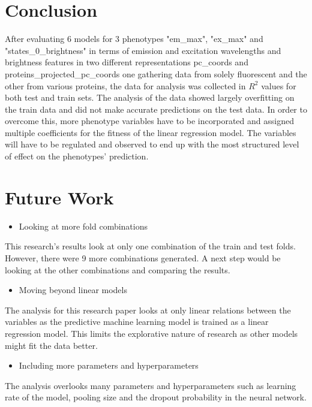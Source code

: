 \documentclass{article}
\begin{document}
\section{Conclusion}
After evaluating 6 models for 3 phenotypes "em\_max", "ex\_max" and        
"states\_0\_brightness" in terms of emission and excitation wavelengths and brightness features in two different representations pc\_coords and proteins\_projected\_pc\_coords one gathering data from solely fluorescent and the other from various proteins, the data for analysis was collected in $R^2$ values for both test and train sets. The analysis of the data showed largely overfitting on the train data and did not make accurate predictions on the test data. In order to overcome this, more phenotype variables have to be incorporated and assigned multiple coefficients for the fitness of the linear regression model. The variables will have to be regulated and observed to end up with the most structured level of effect on the phenotypes' prediction.

\section{Future Work}

\begin{itemize}
\item Looking at more fold combinations
\end{itemize}
This research's results look at only one combination of the train and test folds. However, there were 9 more combinations generated. A next step would be looking at the other combinations and comparing the results. 

\begin{itemize}
\item Moving beyond linear models
\end{itemize}
The analysis for this research paper looks at only linear relations between the variables as the predictive machine learning model is trained as a linear regression model. This limits the explorative nature of research as other models might fit the data better.

\begin{itemize}
\item Including more parameters and hyperparameters
\end{itemize}
The analysis overlooks many parameters and hyperparameters such as learning rate of the model, pooling size and the dropout probability in the neural network. 
\end{document}
